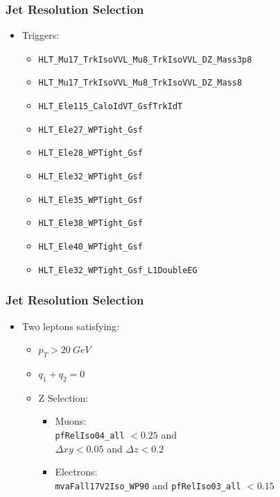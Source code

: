 \documentclass{beamer}
\begin{document}
\begin{frame}
  \frametitle{Jet Resolution Selection}

  \begin{itemize}
  \item Triggers:
    \begin{itemize}
    \item \texttt{HLT\_Mu17\_TrkIsoVVL\_Mu8\_TrkIsoVVL\_DZ\_Mass3p8}
    \item \texttt{HLT\_Mu17\_TrkIsoVVL\_Mu8\_TrkIsoVVL\_DZ\_Mass8}
    \item \texttt{HLT\_Ele115\_CaloIdVT\_GsfTrkIdT}
    \item \texttt{HLT\_Ele27\_WPTight\_Gsf}
    \item \texttt{HLT\_Ele28\_WPTight\_Gsf}
    \item \texttt{HLT\_Ele32\_WPTight\_Gsf}
    \item \texttt{HLT\_Ele35\_WPTight\_Gsf}
    \item \texttt{HLT\_Ele38\_WPTight\_Gsf}
    \item \texttt{HLT\_Ele40\_WPTight\_Gsf}
    \item \texttt{HLT\_Ele32\_WPTight\_Gsf\_L1DoubleEG}
    \end{itemize}
  \end{itemize}

\end{frame}

\begin{frame}
  \frametitle{Jet Resolution Selection}

  \begin{itemize}
  \item Two leptons satisfying:
    \begin{itemize}
    \item $p_T > \SI{20}{GeV}$
    \item $q_1 + q_2 = 0$
    \item Z Selection:
      \begin{itemize}
      \item Muons: \\
        \texttt{pfRelIso04\_all} $< 0.25$ and \\
        $\Delta xy < 0.05$ and $\Delta z < 0.2$
      \item Electrons: \\
        \texttt{mvaFall17V2Iso\_WP90} and \texttt{pfRelIso03\_all} $< 0.15$
      \end{itemize}
    \end{itemize}
  \end{itemize}

\end{frame}
\end{document}

